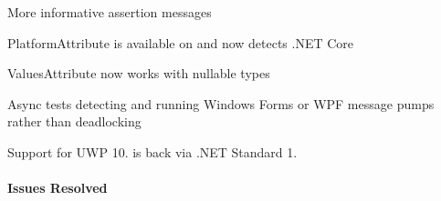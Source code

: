 
\begin{DoxyItemize}
\item More informative assertion messages
\item Platform\+Attribute is available on and now detects .N\+ET Core
\item Values\+Attribute now works with nullable types
\item Async tests detecting and running Windows Forms or W\+PF message pumps rather than deadlocking
\item Support for U\+WP 10. is back via .N\+ET Standard 1.
\end{DoxyItemize}

\paragraph*{Issues Resolved}


